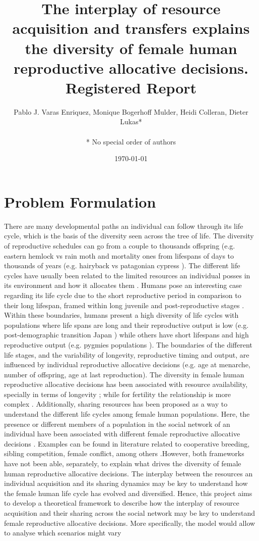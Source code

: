 \documentclass{article}
\title{The interplay of resource acquisition and transfers explains the diversity of female human reproductive allocative decisions.
\\
Registered Report}
\author{Pablo J. Varas Enriquez, Monique Bogerhoff Mulder, Heidi Colleran, Dieter Lukas*\\\\
* No special order of authors}
\date{\today}
\begin{document}
\maketitle

\tableofcontents

\section{Problem Formulation}

There are many developmental paths an individual can follow through its life cycle, which is the basis of the diversity seen across the tree of life. The diversity of reproductive schedules can go from a couple to thousands offspring (e.g. eastern hemlock vs rain moth \citep{tindale1932revision,van2017lifetime} and mortality ones from lifespans of days to thousands of years (e.g. hairyback vs patagonian cypress \citep{balsamo1988life,lara19933620}). The different life cycles have usually been related to the limited resources an individual posses in its environment and how it allocates them \citep{stearns2000life}. Humans pose an interesting case regarding its life cycle due to the short reproductive period in comparison to their long lifespan, framed within long juvenile and post-reproductive stages \citep{kaplan2000theory}. Within these boundaries, humans present a high diversity of life cycles with populations where life spans are long and their reproductive output is low (e.g. post-demographic transition Japan \citep{de2017maximum}) while others have short lifespans and high reproductive output (e.g. pygmies populations \citep{migliano2007life}).  The boundaries of the different life stages, and the variability of longevity, reproductive timing and output, are influenced by individual reproductive allocative decisions (e.g. age at menarche, number of offspring, age at last reproduction). The diversity in female human reproductive allocative decisions has been associated with resource availability, specially in terms of longevity \citep{kaplan2003embodied}; while for fertility the relationship is more complex \citep{mulder1998demographic,sear2016understanding}. Additionally, sharing resources has been proposed as a way to understand the different life cycles among female human populations. Here, the presence or different members of a population in the social network of an individual have been associated with different female reproductive allocative decisions \citep{sear2011much}. Examples can be found in literature related to cooperative breeding, sibling competition, female conflict, among others \citep{ivey2000cooperative,nitsch2013elder,mace2012female}.However, both frameworks have not been able, separately, to explain what drives the diversity of female human reproductive allocative decisions. The interplay between the resources an individual acquisition and its sharing dynamics may be key to understand how the female human life cycle has evolved and diversified. Hence,  this project aims to develop a theoretical framework to describe how the interplay of resource acquisition and their sharing across the social network may be key to understand female reproductive allocative decisions. More specifically, the model would allow to analyse which scenarios might vary 
\end{document}
